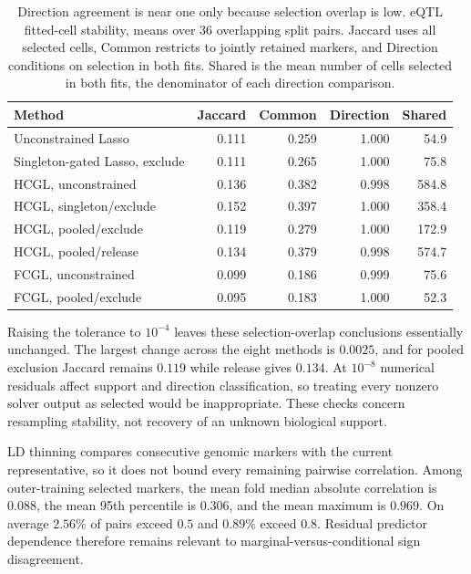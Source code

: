 \documentclass[lineno,pdflatex,sn-basic]{sn-jnl}
\theoremstyle{thmstyleone}
\begin{document}
\begin{table}[htbp]\centering\small\setlength{\tabcolsep}{4pt}
\caption{Direction agreement is near one only because selection overlap is low.
eQTL fitted-cell stability, means over 36 overlapping split pairs.
Jaccard uses all selected cells, Common restricts to jointly retained markers,
and Direction conditions on selection in both fits. Shared is the mean number of
cells selected in both fits, the denominator of each direction comparison.}
\label{tab:eqtl-stability}
\begin{tabular}{lrrrr}\toprule
Method & Jaccard & Common & Direction & Shared\\\midrule
Unconstrained Lasso & 0.111 & 0.259 & 1.000 & 54.9 \\
Singleton-gated Lasso, exclude & 0.111 & 0.265 & 1.000 & 75.8 \\
HCGL, unconstrained & 0.136 & 0.382 & 0.998 & 584.8 \\
HCGL, singleton/exclude & 0.152 & 0.397 & 1.000 & 358.4 \\
HCGL, pooled/exclude & 0.119 & 0.279 & 1.000 & 172.9 \\
HCGL, pooled/release & 0.134 & 0.379 & 0.998 & 574.7 \\
FCGL, unconstrained & 0.099 & 0.186 & 0.999 & 75.6 \\
FCGL, pooled/exclude & 0.095 & 0.183 & 1.000 & 52.3 \\
\bottomrule\end{tabular}
\end{table}

Raising the tolerance to $10^{-4}$ leaves these selection-overlap conclusions
essentially unchanged. The largest change across the eight methods is $0.0025$,
and for pooled exclusion Jaccard remains $0.119$ while release gives $0.134$. At
$10^{-8}$ numerical residuals affect support and direction classification, so
treating every nonzero solver output as selected would be inappropriate. These
checks concern resampling stability, not recovery of an unknown biological
support.

LD thinning compares consecutive genomic markers with the current representative,
so it does not bound every remaining pairwise correlation. Among outer-training
selected markers, the mean fold median absolute correlation is $0.088$, the mean
95th percentile is $0.306$, and the mean maximum is $0.969$. On average $2.56\%$
of pairs exceed $0.5$ and $0.89\%$ exceed $0.8$. Residual predictor dependence
therefore remains relevant to marginal-versus-conditional sign disagreement.
\end{document}
